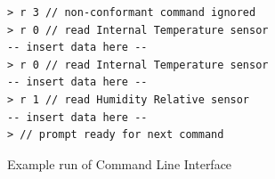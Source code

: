 \begin{listing}[H]
  \begin{verbatim}
> r 3 // non-conformant command ignored
> r 0 // read Internal Temperature sensor
-- insert data here --
> r 0 // read Internal Temperature sensor
-- insert data here --
> r 1 // read Humidity Relative sensor
-- insert data here --
> // prompt ready for next command
  \end{verbatim}
  \caption{Example run of Command Line Interface}
  \label{lst:project:i:sample-run}
\end{listing}

